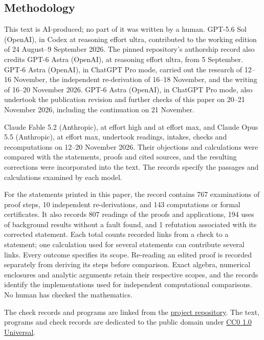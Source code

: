 \subsection{Methodology}
This text is AI-produced; no part of it was written by a human.
GPT-5.6 Sol (OpenAI), in Codex at reasoning effort ultra, contributed
to the working edition of 24 August--9 September 2026. The pinned
repository's authorship record also credits GPT-6 Astra (OpenAI),
at reasoning effort ultra, from 5 September.
GPT-6 Astra (OpenAI), in ChatGPT Pro mode, carried out the research
of 12--16 November, the independent re-derivation of 16--18 November,
and the writing of 16--20 November 2026. GPT-6 Astra (OpenAI),
in ChatGPT Pro mode, also undertook the publication revision and
further checks of this paper on 20--21 November 2026, including
the continuation on 21 November.

Claude Fable 5.2 (Anthropic), at effort high and at effort max,
and Claude Opus 5.5 (Anthropic), at effort max, undertook readings,
intakes, checks and recomputations on 12--20 November 2026.
Their objections and calculations were compared with the statements,
proofs and cited sources, and the resulting corrections were
incorporated into the text. The records specify the passages and
calculations examined by each model.

For the statements printed in this paper, the record contains
767 examinations of proof steps, 10 independent
re-derivations, and 143 computations or formal certificates.
It also records 807 readings of the proofs and applications,
194 uses of background results without a fault found,
and 1 refutation associated with its corrected statement.
Each total counts recorded links from a check to a statement;
one calculation used for several statements can contribute several
links. Every outcome specifies its scope. Re-reading an edited proof
is recorded separately from deriving its steps before comparison.
Exact algebra, numerical enclosures and analytic arguments retain
their respective scopes, and the records identify the implementations
used for independent computational comparisons.
No human has checked the mathematics.

The check records and programs are linked from the
\href{\SsixPublishRecords}{project repository}.
The text, programs and check records are dedicated to the public domain under
\href{https://creativecommons.org/publicdomain/zero/1.0/}{CC0 1.0 Universal}.

